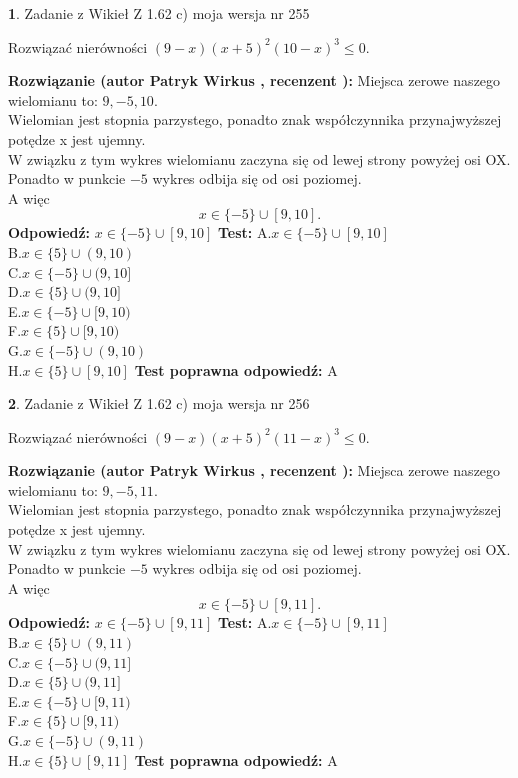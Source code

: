 \documentclass[12pt, a4paper]{article}
\theoremstyle{definition} %
\newtheorem{zad}{}
\newcommand{\zadStart}[1]{\begin{zad}#1\newline}
\newcommand{\zadStop}{\end{zad}}
\newcommand{\rozwStart}[2]{\noindent \textbf{Rozwiązanie (autor #1 , recenzent #2): }\newline}
\newcommand{\rozwStop}{\newline}
\newcommand{\odpStart}{\noindent \textbf{Odpowiedź:}\newline}
\newcommand{\odpStop}{\newline}
\newcommand{\testStart}{\noindent \textbf{Test:}\newline}
\newcommand{\testStop}{\newline}
\newcommand{\kluczStart}{\noindent \textbf{Test poprawna odpowiedź:}\newline}
\newcommand{\kluczStop}{\newline}
\begin{document}
\zadStart{Zadanie z Wikieł Z 1.62 c) moja wersja nr 255}

Rozwiązać nierówności $(9-x)(x+5)^{2}(10-x)^{3}\le0$.
\zadStop
\rozwStart{Patryk Wirkus}{}
Miejsca zerowe naszego wielomianu to: $9, -5, 10$.\\
Wielomian jest stopnia parzystego, ponadto znak współczynnika przy\linebreak najwyższej potędze x jest ujemny.\\ W związku z tym wykres wielomianu zaczyna się od lewej strony powyżej osi OX.\\
Ponadto w punkcie $-5$ wykres odbija się od osi poziomej.\\
A więc $$x \in \{-5\} \cup [9,10].$$
\rozwStop
\odpStart
$x \in \{-5\} \cup [9,10]$
\odpStop
\testStart
A.$x \in \{-5\} \cup [9,10]$\\
B.$x \in \{5\} \cup (9,10)$\\
C.$x \in \{-5\} \cup (9,10]$\\
D.$x \in \{5\} \cup (9,10]$\\
E.$x \in \{-5\} \cup [9,10)$\\
F.$x \in \{5\} \cup [9,10)$\\
G.$x \in \{-5\} \cup (9,10)$\\
H.$x \in \{5\} \cup [9,10]$
\testStop
\kluczStart
A
\kluczStop



\zadStart{Zadanie z Wikieł Z 1.62 c) moja wersja nr 256}

Rozwiązać nierówności $(9-x)(x+5)^{2}(11-x)^{3}\le0$.
\zadStop
\rozwStart{Patryk Wirkus}{}
Miejsca zerowe naszego wielomianu to: $9, -5, 11$.\\
Wielomian jest stopnia parzystego, ponadto znak współczynnika przy\linebreak najwyższej potędze x jest ujemny.\\ W związku z tym wykres wielomianu zaczyna się od lewej strony powyżej osi OX.\\
Ponadto w punkcie $-5$ wykres odbija się od osi poziomej.\\
A więc $$x \in \{-5\} \cup [9,11].$$
\rozwStop
\odpStart
$x \in \{-5\} \cup [9,11]$
\odpStop
\testStart
A.$x \in \{-5\} \cup [9,11]$\\
B.$x \in \{5\} \cup (9,11)$\\
C.$x \in \{-5\} \cup (9,11]$\\
D.$x \in \{5\} \cup (9,11]$\\
E.$x \in \{-5\} \cup [9,11)$\\
F.$x \in \{5\} \cup [9,11)$\\
G.$x \in \{-5\} \cup (9,11)$\\
H.$x \in \{5\} \cup [9,11]$
\testStop
\kluczStart
A
\kluczStop
\end{document}
